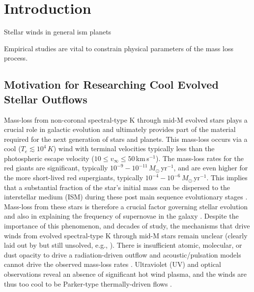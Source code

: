 \chapter{Introduction} \label{chap:1}

Stellar winds in general ism planets

Empirical studies are vital to constrain physical parameters of the mass loss process. 

\pagebreak

\section{Motivation for Researching Cool Evolved Stellar Outflows}\label{sec:1}

Mass-loss from non-coronal spectral-type K through mid-M evolved stars plays a crucial role in galactic evolution and ultimately provides part of the material required for the next generation of stars and planets. This mass-loss occurs via a cool ($T_{e} \lesssim 10^4\,K$) wind with terminal velocities typically less than the photospheric escape velocity ($10 \leq v_{\infty} \leq 50$\,km\,s$^{-1}$). The mass-loss rates for the red giants are significant, typically $10^{-9}-10^{-11}$\,$M_{\odot}$\,yr$^{-1}$, and are even higher for the more short-lived red supergiants, typically $10^{-4}-10^{-6}$\,$M_{\odot}$\,yr$^{-1}$. This implies that a substantial fraction of the star's initial mass can be dispersed to the interstellar medium (ISM) during these post main sequence evolutionary stages \citep[e.g.,][]{schroder_2001}. Mass-loss from these stars is therefore a crucial factor governing stellar evolution \citep{chiosi_1986} and also in explaining the frequency of supernovae in the galaxy \citep{van_loon_2010}. Despite the importance of this phenomenon, and decades of study, the mechanisms that drive winds from evolved spectral-type K through mid-M stars remain unclear (clearly laid out by \citealt{holzer_1985} but still unsolved, e.g., \citealt{crowley_2009}). There is insufficient atomic, molecular, or dust opacity to drive a radiation-driven outflow \citep{zukerman_1995,jones_2008} and acoustic/pulsation models cannot drive the observed mass-loss rates \citep{sutmann_1995}. Ultraviolet (UV) and optical observations reveal an absence of significant hot wind plasma, and the winds are thus too cool to be Parker-type thermally-driven flows \cite[e.g.,][]{linsky_1979,haisch_1980,ayres_1981}. 

